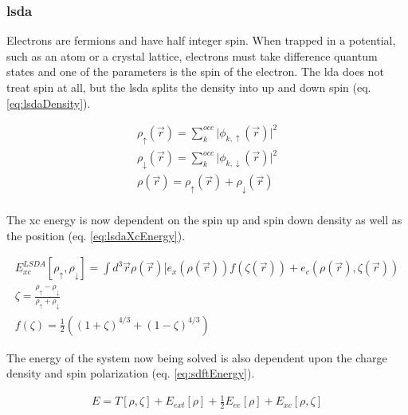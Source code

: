 \subsubsection{\acrshort{lsda}}

Electrons are fermions and have half integer spin.  When trapped in a potential, such as an atom or a crystal lattice, electrons must take difference quantum states and one of the parameters is the spin of the electron.  The \acrshort{lda} does not treat spin at all, but the \acrshort{lsda} splits the density into up and down spin (eq. \ref{eq:lsdaDensity}\cite{ldaggaperdew}).

\begin{equation}
\begin{split}
\rho_{\uparrow}(\vec{r}) = \sum_{k}^{occ} \lvert \phi_{k, \uparrow}(\vec{r})\rvert^2 \\
\rho_{\downarrow}(\vec{r}) = \sum_{k}^{occ} \lvert \phi_{k, \downarrow}(\vec{r})\rvert^2 \\
\rho(\vec{r}) = \rho_{\uparrow}(\vec{r}) + \rho_{\downarrow}(\vec{r}) \\
\end{split}
\label{eq:lsdaDensity}
\end{equation}

The \acrshort{xc} energy is now dependent on the spin up and spin down density as well as the position (eq. \ref{eq:lsdaXcEnergy}\cite{ldaggaperdew}).

\begin{equation}
\begin{split}
E_{xc}^{LSDA}[\rho_{\uparrow},\rho_{\downarrow}] = \int d^3\vec{r} \rho(\vec{r})[e_x (\rho(\vec{r})) f(\zeta(\vec{r})) + e_c (\rho(\vec{r}), \zeta(\vec{r})) \\
\zeta = \frac{\rho_{\uparrow} - \rho_{\downarrow}}{\rho_{\uparrow} + \rho_{\downarrow}} \\
 f(\zeta) = \frac{1}{2} \left((1 + \zeta)^{4/3} + (1 - \zeta)^{4/3}\right)
\end{split}
\label{eq:lsdaXcEnergy}
\end{equation}

The energy of the system now being solved is also dependent upon the charge density and spin polarization (eq. \ref{eq:sdftEnergy}).

\begin{equation}
\begin{split}
E = T[\rho, \zeta] + E_{ext} [\rho] + \frac{1}{2} E_{ee}[\rho] + E_{xc}[\rho, \zeta]
\end{split}
\label{eq:sdftEnergy}
\end{equation}


